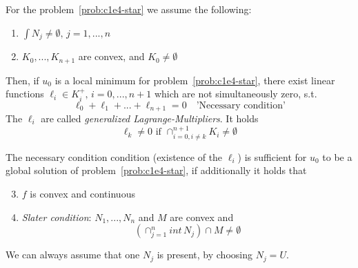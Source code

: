 \documentclass[../skript.tex]{subfiles}
\begin{document}
\begin{theorem}\label{thm:c1e39}
	For the problem~\ref{prob:c1e4-star} we assume the following:
	\begin{enumerate}
		\item\label{thm:c1e39:e1} $\int{N_j}\not=\emptyset,\,j=1,...,n$
		\item \label{thm:c139:e2} $K_0,...,K_{n+1}$ are convex, and $K_0\not=\emptyset$
	\end{enumerate}
	Then, if $u_0$ is a local minimum for problem~\ref{prob:c1e4-star}, there exist linear functions $\ell_i\in K_i^+,\,i=0,...,n+1$ which are not simultaneously zero, s.t. 
	\[
		\ell_0+\ell_1+...+\ell_{n+1} = 0\quad\text{'Necessary condition'}
	\]
	The $\ell_i$ are called \emph{generalized Lagrange-Multipliers}. It holds
	\[
		\ell_k\not=0\text{ if }\cap_{i=0,i\not=k}^{n+1} K_i\not=\emptyset
	\]
\end{theorem}

The necessary condition condition (existence of the $\ell_i$) is sufficient for $u_0$ to be a global solution of problem~\ref{prob:c1e4-star}, if additionally it holds that
\begin{enumerate}
	\setcounter{enumi}{2}
	\item \label{thm:c1e39:e3}$f$ is convex and continuous
	\item \label{thm:c1e39:e4}\emph{Slater condition}: $N_1,...,N_n$ and $M$ are convex and
			\[
				\left(\cap_{j=1}^n int\,N_j\right)\cap M\not=\emptyset
			\]
\end{enumerate} 

\begin{remark*}
	We can always assume that one $N_j$ is present, by choosing $N_j=U$.
\end{remark*}
\end{document}
